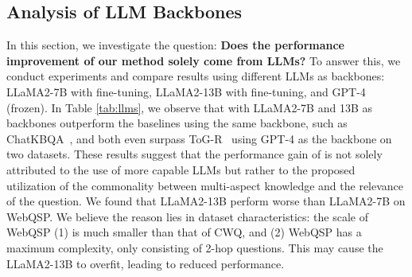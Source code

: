 \subsection{Analysis of LLM Backbones}
In this section, we investigate the question: \textbf{Does the performance improvement of our method solely come from LLMs?} To answer this, we conduct experiments and compare results using different LLMs as backbones: LLaMA2-7B with fine-tuning, LLaMA2-13B with fine-tuning, and GPT-4 (frozen).
In Table \ref{tab:llms}, we observe that \model with LLaMA2-7B and 13B as backbones outperform the baselines using the same backbone, such as ChatKBQA~\cite{chatkbqa}, and both even surpass ToG-R~\cite{TOG} using GPT-4 as the backbone on two datasets.
These results suggest that the performance gain of \model is not solely attributed to the use of more capable LLMs but rather to the proposed utilization of the commonality between multi-aspect knowledge and the relevance of the question.
We found that LLaMA2-13B perform worse than LLaMA2-7B on WebQSP. We believe the reason lies in dataset characteristics: the scale of WebQSP (1) is much smaller than that of CWQ, and (2) WebQSP has a maximum complexity, only consisting of 2-hop questions. This may cause the LLaMA2-13B to overfit, leading to reduced performance.


\begin{table}[t]
\fontsize{9}{11}\selectfont
\centering
{}
 \caption{Analysis on different LLM backbones. }
\label{tab:llms}
\end{table}







 